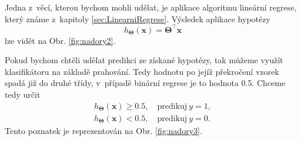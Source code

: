\par{Jedna z~věcí, kterou bychom mohli udělat, je aplikace algoritmu lineární regrese, který známe z~kapitoly \ref{sec:LinearniRegrese}. Výsledek aplikace hypotézy
\begin{equation}
	h_{\bm{\Theta}} \left( \bm{x} \right) = \bm{\Theta}^{\top} \bm{x}
\end{equation}
lze vidět na Obr. \ref{fig:nadory2}.}

\par{Pokud bychom chtěli udělat predikci ze získané hypotézy, tak můžeme využít klasifikátoru na základě prahování. Tedy hodnotu po jejíž překročení vzorek spadá již do druhé třídy, v~případě binární regrese je to hodnota 0.5. Chceme tedy určit
\begin{eqnarray}
	\label{eq:prah1}
	h_{\bm{\Theta}} \left( \bm{x} \right) \geq 0.5, \quad \mathrm{predikuj~} y = 1,\\
	\label{eq:prah2}
	h_{\bm{\Theta}} \left( \bm{x} \right) < 0.5, \quad \mathrm{predikuj~} y = 0.
\end{eqnarray}
Tento poznatek je reprezentován na Obr. \ref{fig:nadory3}.

}
